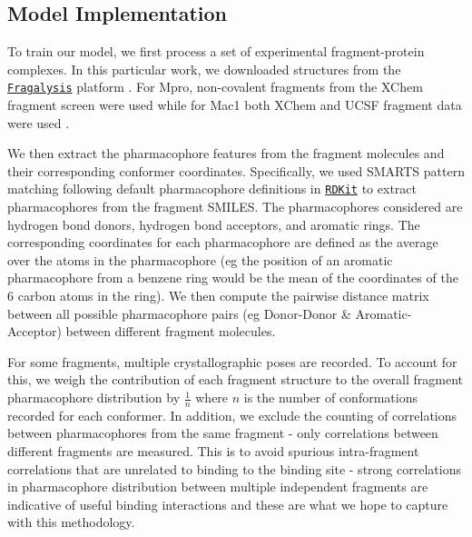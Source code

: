 \subsection{Model Implementation} \label{subsec:model_construction}

To train our model, we first process a set of experimental fragment-protein complexes. In this particular work, we downloaded structures from the \href{https://fragalysis.diamond.ac.uk/viewer/react/landing}{\texttt{Fragalysis}} platform \cite{Douangamath2020XChem}. For Mpro, non-covalent fragments from the XChem fragment screen \cite{Douangamath2020XChem} were used while for Mac1 both XChem and UCSF fragment data were used \cite{Schuller2021Mac1Frag}.

We then extract the pharmacophore features from the fragment molecules and their corresponding conformer coordinates. Specifically, we used SMARTS pattern matching following default pharmacophore definitions in \href{https://www.rdkit.org/docs/index.html}{\texttt{RDKit}} to extract pharmacophores from the fragment SMILES. The pharmacophores considered are hydrogen bond donors, hydrogen bond acceptors, and aromatic rings. The corresponding coordinates for each pharmacophore are defined as the average over the atoms in the pharmacophore (eg the position of an aromatic pharmacophore from a benzene ring would be the mean of the coordinates of the 6 carbon atoms in the ring). We then compute the pairwise distance matrix between all possible pharmacophore pairs (eg Donor-Donor \& Aromatic-Acceptor) between different fragment molecules.

For some fragments, multiple crystallographic poses are recorded. To account for this, we weigh the contribution of each fragment structure to the overall fragment pharmacophore distribution by $\frac{1}{n}$ where $n$ is the number of conformations recorded for each conformer. In addition, we exclude the counting of correlations between pharmacophores from the same fragment - only correlations between different fragments are measured. This is to avoid spurious intra-fragment correlations that are unrelated to binding to the binding site - strong correlations in pharmacophore distribution between multiple independent fragments are indicative of useful binding interactions and these are what we hope to capture with this methodology.

